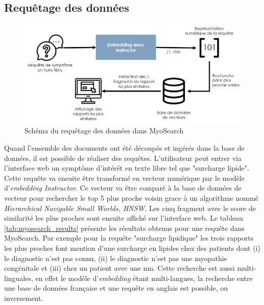 \subsection{Requêtage des données}
\begin{figure}[htbp]
  \centering
  \includegraphics[width=1\textwidth]{figures/myosearch_query.png}
  \caption[Requêtage des données dans MyoSearch]{Schéma du requêtage des données dans MyoSearch}
  \label{fig:myoclassify_conf}
\end{figure}
Quand l'ensemble des documents ont été découpés et ingérés dans la base de données, il est possible de réaliser des requêtes. L'utilisateur peut entrer via l'interface web un symptôme d'intérêt en texte libre tel que "surcharge lipide". Cette requête va ensuite être transformé en vecteur numérique par le modèle d'\textit{embedding }\textit{Instructor}. Ce vecteur va être comparé à la base de données de vecteur pour rechercher le top 5 plus proche voisin grace à un algorithme nommé \textit{Hierarchical Navigable Small Worlds, HNSW}. Les cinq fragment avec le score de similarité les plus proches sont ensuite affiché sur l'interface web.  Le tableau \ref{tab:myosearch_results} présente les résultats obtenus pour une requête dans MyoSearch. Par exemple pour la requête "surcharge lipidique" les trois rapports les plus proches font mention d'une surcharge en lipides chez des patients dont (i) le diagnostic n'est pas connu, (ii) le diagnostic n'est pas une myopathie congénitale et (iii) chez un patient avec une \gls{nm}. Cette recherche est aussi multi-linguales, en effet le modèle d'\textit{embedding} étant multi-langues, la recherche entre une base de données française et une requête en anglais est possible, ou inversement.

